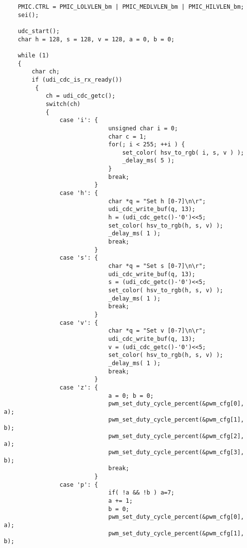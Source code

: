 \documentclass[a4paper]{article}
\begin{document}
\begin{lstlisting}
    PMIC.CTRL = PMIC_LOLVLEN_bm | PMIC_MEDLVLEN_bm | PMIC_HILVLEN_bm;
    sei();

    udc_start();
    char h = 128, s = 128, v = 128, a = 0, b = 0;

    while (1)
    {
        char ch;
        if (udi_cdc_is_rx_ready())
         {
            ch = udi_cdc_getc();
            switch(ch)
            {
                case 'i': {
                              unsigned char i = 0;
                              char c = 1;
                              for(; i < 255; ++i ) {
                                  set_color( hsv_to_rgb( i, s, v ) );
                                  _delay_ms( 5 );
                              }
                              break;
                          }
                case 'h': {
                              char *q = "Set h [0-7]\n\r";
                              udi_cdc_write_buf(q, 13);
                              h = (udi_cdc_getc()-'0')<<5;
                              set_color( hsv_to_rgb(h, s, v) );
                              _delay_ms( 1 );
                              break;
                          }
                case 's': {
                              char *q = "Set s [0-7]\n\r";
                              udi_cdc_write_buf(q, 13);
                              s = (udi_cdc_getc()-'0')<<5;
                              set_color( hsv_to_rgb(h, s, v) );
                              _delay_ms( 1 );
                              break;
                          }
                case 'v': {
                              char *q = "Set v [0-7]\n\r";
                              udi_cdc_write_buf(q, 13);
                              v = (udi_cdc_getc()-'0')<<5;
                              set_color( hsv_to_rgb(h, s, v) );
                              _delay_ms( 1 );
                              break;
                          }
                case 'z': {
                              a = 0; b = 0;
                              pwm_set_duty_cycle_percent(&pwm_cfg[0], a);
                              pwm_set_duty_cycle_percent(&pwm_cfg[1], b);
                              pwm_set_duty_cycle_percent(&pwm_cfg[2], a);
                              pwm_set_duty_cycle_percent(&pwm_cfg[3], b);
                              break;
                          }
                case 'p': {
                              if( !a && !b ) a=7;
                              a += 1;
                              b = 0;
                              pwm_set_duty_cycle_percent(&pwm_cfg[0], a);
                              pwm_set_duty_cycle_percent(&pwm_cfg[1], b);

\end{lstlisting}
\end{document}
